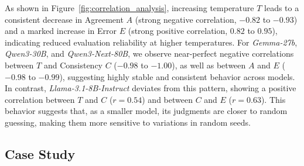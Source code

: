 \documentclass[11pt]{article}
\begin{document}
As shown in Figure~\ref{fig:correlation_analysis}, increasing temperature \(T\) leads to a consistent decrease in Agreement \(A\) (strong negative correlation, \(-0.82\) to \(-0.93\)) and a marked increase in Error \(E\) (strong positive correlation, \(0.82\) to \(0.95\)), indicating reduced evaluation reliability at higher temperatures.  For \textit{Gemma-27b}, \textit{Qwen3-30B}, and \textit{Qwen3-Next-80B}, we observe near-perfect negative correlations between \(T\) and Consistency \(C\) (\(-0.98\) to \(-1.00\)), as well as between \(A\) and \(E\) (\(-0.98\) to \(-0.99\)), suggesting highly stable and consistent behavior across models. In contrast, \textit{Llama-3.1-8B-Instruct} deviates from this pattern, showing a positive correlation between \(T\) and \(C\) (\(r = 0.54\)) and between \(C\) and \(E\) (\(r = 0.63\)). This behavior suggests that, as a smaller model, its judgments are closer to random guessing, making them more sensitive to variations in random seeds.

























\subsection{Case Study}
\end{document}
